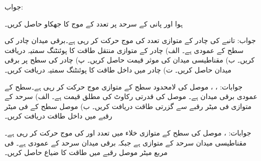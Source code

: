 جواب:

ہوا اور پانی  کے سرحد پر  تعدد کے موج کا جھکاو حاصل کریں۔

جواب:
تانبے کی چادر کے متوازی  تعدد کی موج حرکت کر رہی ہے۔برقی میدان  چادر کی سطح کے عمودی ہے۔ الف) چادر کے متوازی منتقل طاقت کا پوئنٹنگ سمتیہ دریافت کریں۔ ب) مقناطیسی میدان کی موثر قیمت حاصل کریں۔ پ) چادر کی سطح پر برقی میدان حاصل کریں۔ ت) چادر میں داخل طاقت کا پوئنٹنگ سمتیہ دریافت کریں۔

جوابات: ، ،  
موصل کی لامحدود سطح کے متوازی موج حرکت کر رہی ہے۔سطح کے عمودی برقی میدان  ہے۔ موصل کی قدرتی رکاوٹ کی مطلق قیمت  ہے۔ الف) سرحد کے متوازی فی میٹر رقبے سے گزرتی طاقت دریافت کریں۔ ب) موصل سطح کے فی میٹر رقبے میں داخل طاقت دریافت کریں۔

جوابات: ، 
موصل  کی سطح  کے متوازی خلاء میں  تعدد
 اور  کی موج  حرکت کر رہی ہے۔مقناطیسی میدان سرحد کے متوازی ہے جبکہ برقی میدان سرحد کے عمودی ہے۔ فی مربع میٹر موصل رقبے میں طاقت کا ضیاع حاصل کریں۔

